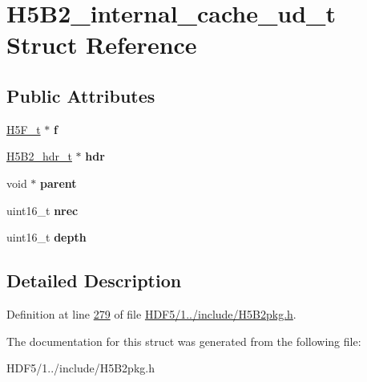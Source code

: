 \hypertarget{struct_h5_b2__internal__cache__ud__t}{}\section{H5\+B2\+\_\+internal\+\_\+cache\+\_\+ud\+\_\+t Struct Reference}
\label{struct_h5_b2__internal__cache__ud__t}
\subsection*{Public Attributes}
\begin{DoxyCompactItemize}
\item 
\mbox{\label{struct_h5_b2__internal__cache__ud__t_ab77b0f0a50fe7a0b07f2fd2e25ce14e7}} 
\hyperlink{struct_h5_f__t}{H5\+F\+\_\+t} $\ast$ {\bfseries f}
\item 
\mbox{\label{struct_h5_b2__internal__cache__ud__t_a3c5102415ad5a220639674e1cac70aa8}} 
\hyperlink{struct_h5_b2__hdr__t}{H5\+B2\+\_\+hdr\+\_\+t} $\ast$ {\bfseries hdr}
\item 
\mbox{\label{struct_h5_b2__internal__cache__ud__t_a89a8681c740f8d370d1862c73922907d}} 
void $\ast$ {\bfseries parent}
\item 
\mbox{\label{struct_h5_b2__internal__cache__ud__t_a05bfa6b426c4036d0a12334b4a34fefe}} 
uint16\+\_\+t {\bfseries nrec}
\item 
\mbox{\label{struct_h5_b2__internal__cache__ud__t_af1a788f15bade22cb4c6e72e912970be}} 
uint16\+\_\+t {\bfseries depth}
\end{DoxyCompactItemize}


\subsection{Detailed Description}


Definition at line \hyperlink{_h_d_f5_21_810_81_2include_2_h5_b2pkg_8h_source_l00279}{279} of file \hyperlink{_h_d_f5_21_810_81_2include_2_h5_b2pkg_8h_source}{H\+D\+F5/1../include/\+H5\+B2pkg.\+h}.



The documentation for this struct was generated from the following file\+:\begin{DoxyCompactItemize}
\item 
H\+D\+F5/1../include/\+H5\+B2pkg.\+h\end{DoxyCompactItemize}
